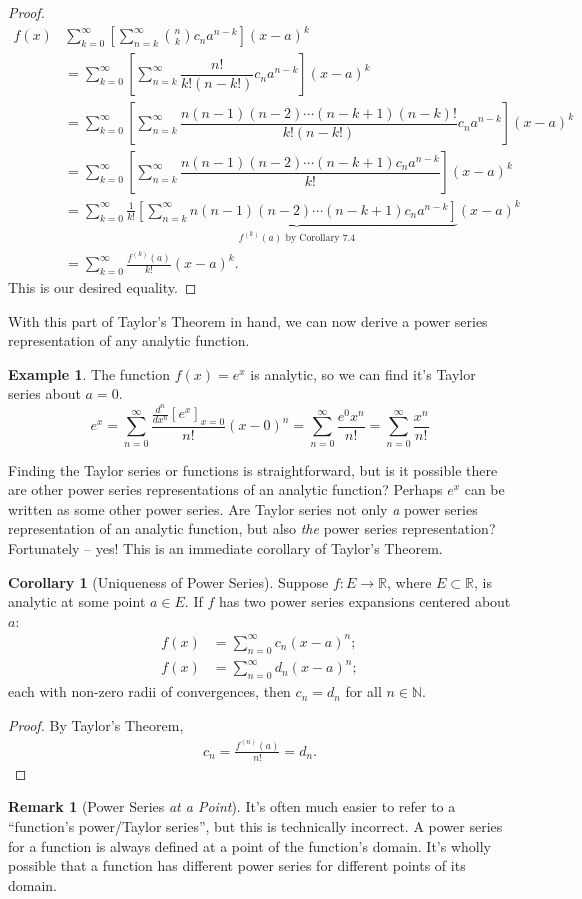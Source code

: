 \documentclass{article}
\newcommand{\N}{\mathbb{N}}
\newcommand{\R}{\mathbb{R}}
\theoremstyle{definition}
\newtheorem{corollary}{Corollary}[section]
\newtheorem{example}{Example}[section]
\newtheorem{remark}{Remark}[section]
\begin{document}
\begin{proof}
\begin{align*}
 f(x) & \sum_{k=0}^{\infty}\left[\sum_{n=k}^{\infty}\binom{n}{k}c_na^{n-k}\right](x-a)^k\\
 	& = \sum_{k=0}^{\infty}\left[\sum_{n=k}^{\infty}\dfrac{n!}{k!(n-k!)}c_na^{n-k}\right](x-a)^k\\
 	& = \sum_{k=0}^{\infty}\left[\sum_{n=k}^{\infty}\dfrac{n(n-1)(n-2)\cdots(n-k+1)(n-k)!}{k!(n-k!)}c_na^{n-k}\right](x-a)^k\\
 	& = \sum_{k=0}^{\infty}\left[\sum_{n=k}^{\infty}\dfrac{n(n-1)(n-2)\cdots(n-k+1)c_na^{n-k}}{k!}\right](x-a)^k\\
 		& = \sum_{k=0}^{\infty}\frac{1}{k!}\underbrace{\left[\sum_{n=k}^{\infty}n(n-1)(n-2)\cdots (n-k+1)c_na^{n-k}\right]}_{f^{(k)}(a) \text{ by Corollary 7.4}}(x-a)^k\\
 		& = \sum_{k=0}^{\infty}\frac{f^{(k)}(a) }{k!}(x-a)^k.
\end{align*}
This is our desired equality. 
\end{proof}

With this part of Taylor's Theorem in hand, we can now derive a power series representation of any analytic function.
\begin{example}
	The function $ f(x)=e^x $ is analytic, so we can find it's Taylor series about $ a = 0 $. 
	$$ e^x=\sum_{n=0}^{\infty}\frac{\frac{d^n}{dx^n}\left[e^x\right]_{x=0} }{n!}(x-0)^n = \sum_{n=0}^{\infty}\frac{e^0x^n}{n!} = \sum_{n=0}^{\infty}\frac{x^n}{n!} $$
\end{example}
Finding the Taylor series or functions is straightforward, but is it possible there are other power series representations of an analytic function? Perhaps $ e^x $ can be written as some other power series. Are Taylor series not only \textit{a} power series representation of an analytic function, but also \textit{the} power series representation? Fortunately -- yes! This is an immediate corollary of Taylor's Theorem. 

\begin{corollary}[Uniqueness of Power Series]
	Suppose $ f:E\to\R $, where $ E\subset\R $, is analytic at some point $ a\in E $. If $ f $ has two power series expansions centered about $ a $:
	\begin{align*}
		f(x)&=\sum_{n=0}^{\infty}c_n(x-a)^n;\\
		f(x)&=\sum_{n=0}^{\infty}d_n(x-a)^n;
	\end{align*}
each with non-zero radii of convergences, then $ c_n = d_n $ for all $ n\in\N $. 
\end{corollary} 
\begin{proof}
	By Taylor's Theorem,
	\begin{align*}
		c_n=\frac{f^{(n)}(a) }{n!}=d_n.
	\end{align*}
\end{proof}
\begin{remark}[Power Series \textit{at a Point}]
	It's often much easier to refer to a ``function's power/Taylor series'', but this is technically incorrect. A power series for a function is always defined at a point of the function's domain. It's wholly possible that a function has different power series for different points of its domain.
\end{remark}
\end{document}
